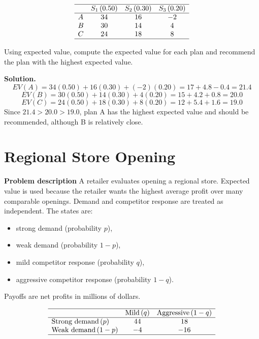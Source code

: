 \begin{ExamProblems}
		\[
		\begin{array}{lccc}
			\hline
			& S_1\,(0.50) & S_2\,(0.30) & S_3\,(0.20) \\
			\hline
			A & 34 & 16 & -2 \\
			B & 30 & 14 & 4 \\
			C & 24 & 18 & 8 \\
			\hline
		\end{array}
		\]
		
		Using expected value, compute the expected value for each plan and recommend the plan with the highest expected value.
		
		\textbf{Solution.}
		\[
		EV(A)=34(0.50)+16(0.30)+(-2)(0.20)=17+4.8-0.4=21.4
		\]
		\[
		EV(B)=30(0.50)+14(0.30)+4(0.20)=15+4.2+0.8=20.0
		\]
		\[
		EV(C)=24(0.50)+18(0.30)+8(0.20)=12+5.4+1.6=19.0
		\]
		Since \(21.4>20.0>19.0\), plan A has the highest expected value and should be recommended, although B is relatively close.
		
		
		\hypertarget{c7-cu-ex8}{}
		\item
		\section{Regional Store Opening}
		
		\textbf{Problem description}
		A retailer evaluates opening a regional store. Expected value is used because the retailer wants the highest average profit over many comparable openings. Demand and competitor response are treated as independent. The states are:
		\begin{itemize}
			\item strong demand (probability \(p\)),
			\item weak demand (probability \(1-p\)),
			\item mild competitor response (probability \(q\)),
			\item aggressive competitor response (probability \(1-q\)).
		\end{itemize}
		Payoffs are net profits in millions of dollars.
		
		\[
		\begin{array}{lcc}
			\hline
			& \text{Mild}\,(q) & \text{Aggressive}\,(1-q) \\
			\hline
			\text{Strong demand}\,(p) & 44 & 18 \\
			\text{Weak demand}\,(1-p) & -4 & -16 \\
			\hline
		\end{array}
		\]
		

\end{ExamProblems}
